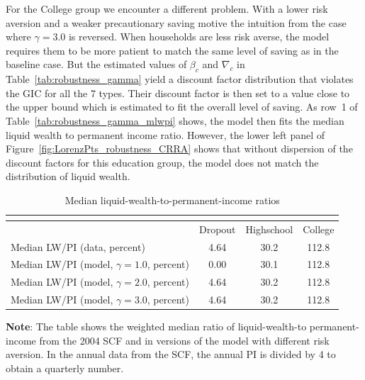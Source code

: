 \documentclass[\econtexRoot/HAFiscal]{subfiles}
\begin{document}
For the College group we encounter a different problem.
With a lower risk aversion and a weaker precautionary saving motive the intuition from the case where $\gamma=3.0$ is reversed.
When households are less risk averse, the model requires them to be more patient to match the same level of saving as in the baseline case.
But the estimated values of $\beta_c$ and $\nabla_c$ in Table~\ref{tab:robustness_gamma} yield a discount factor distribution that violates the GIC for all the 7 types.
Their discount factor is then set to a value close to the upper bound which is estimated to fit the overall level of saving.
As row~1 of Table~\ref{tab:robustness_gamma_mlwpi} shows, the model then fits the median liquid wealth to permanent income ratio.
However, the lower left panel of Figure~\ref{fig:LorenzPts_robustness_CRRA} shows that without dispersion of the discount factors for this education group, the model does not match the distribution of liquid wealth.

 
\begin{table}[th]
  \begin{center}
    \begin{tabular}{lccc}
      \multicolumn{4}{l}{} \\ \midrule
      & Dropout & Highschool & College \\ \midrule
      Median LW/PI (data, percent) & 4.64 & 30.2 & 112.8 \\ 
      Median LW/PI (model, $\gamma = 1.0$, percent) & 0.00 & 30.1 & 112.8 \\	
      Median LW/PI (model, $\gamma = 2.0$, percent) & 4.64 & 30.2 & 112.8 \\
      Median LW/PI (model, $\gamma = 3.0$, percent) & 4.64 & 30.2 & 112.8 \\ \bottomrule
    \end{tabular}
    \caption{Median liquid-wealth-to-permanent-income ratios}
    \notinsubfile{\label{tab:robustness_gamma_mlwpi}}	
    \parbox{15cm}{\small \vspace{.05cm} \textbf{Note}: The table shows the weighted median ratio of liquid-wealth-to permanent-income from the 2004 SCF and in versions of the model with different risk aversion.
In the annual data from the SCF, the annual PI is divided by 4 to obtain a quarterly number.\normalsize}
  \end{center}
\end{table}
\end{document}
